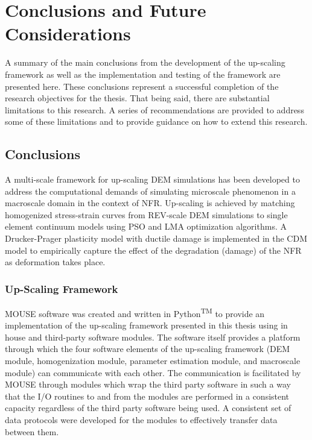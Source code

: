 \chapter{Conclusions and Future Considerations}

A summary of the main conclusions from the development of the up-scaling framework as well as the implementation and testing of the framework are presented here. These conclusions represent a successful completion of the research objectives for the thesis. That being said, there are substantial limitations to this research. A series of recommendations are provided to address some of these limitations and to provide guidance on how to extend this research.

\section{Conclusions}
A multi-scale framework for up-scaling DEM simulations has been developed to address the computational demands of simulating microscale phenomenon in a macroscale domain in the context of NFR. Up-scaling is achieved by matching homogenized stress-strain curves from REV-scale DEM simulations to single element continuum models using PSO and LMA optimization algorithms. A Drucker-Prager plasticity model with ductile damage is implemented in the CDM model to empirically capture the effect of the degradation (damage) of the NFR as deformation takes place.

\subsection*{Up-Scaling Framework}

MOUSE software was created and written in Python\textsuperscript{TM} to provide an implementation of the up-scaling framework presented in this thesis using in house and third-party software modules. The software itself provides a platform through which the four software elements of the up-scaling framework (DEM module, homogenization module, parameter estimation module, and macroscale module) can communicate with each other. The communication is facilitated by MOUSE through modules which wrap the third party software in such a way that the I/O routines to and from the modules are performed in a consistent capacity regardless of the third party software being used. A consistent set of data protocols were developed for the modules to effectively transfer data between them.

